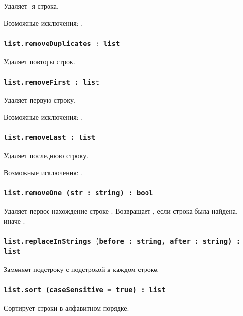 Удаляет -я строка.

Возможные исключения: .

\subsubsection{\lstinline|list.removeDuplicates : list|}

Удаляет повторы строк.

\subsubsection{\lstinline|list.removeFirst : list|}

Удаляет первую строку.

Возможные исключения: .

\subsubsection{\lstinline|list.removeLast : list|}

Удаляет последнюю строку.

Возможные исключения: .

\subsubsection{\lstinline|list.removeOne (str : string) : bool|}

Удаляет первое нахождение строке . Возвращает \true, если строка была найдена, иначе \false.

\subsubsection{\lstinline|list.replaceInStrings (before : string, after : string) : list|}

Заменяет подстроку  с подстрокой  в каждом строке.

\subsubsection{\lstinline|list.sort (caseSensitive = true) : list|}

Сортирует строки в алфавитном порядке.

